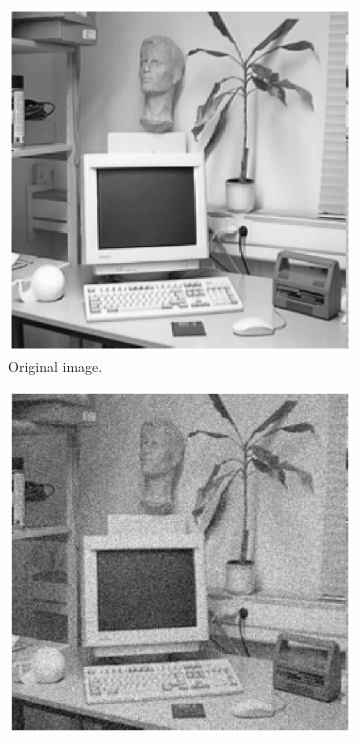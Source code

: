 \documentclass[11pt,a4paper]{article}
\begin{document}
\begin{figure}[!ht]
	\centering 
	\begin{subfigure}[t]{.32\linewidth} %
		\includegraphics[width=0.95\columnwidth]{Office.eps}
		\caption{\scriptsize Original image.}
		\label{fig:office}
	\end{subfigure}
	\begin{subfigure}[t]{.32\linewidth} %
		\includegraphics[width=\columnwidth]{Office_Gauss_Noise.eps}

\end{subfigure}
\end{figure}
\end{document}
